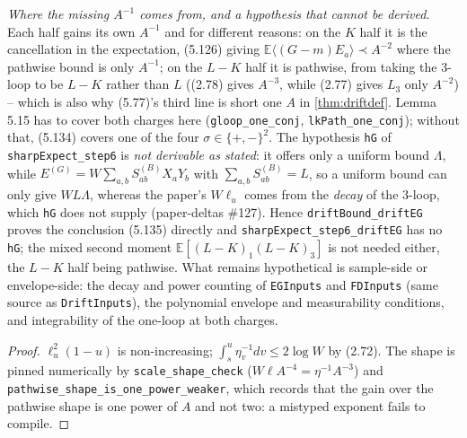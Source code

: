\begin{theorem}
  \emph{Where the missing $A^{-1}$ comes from, and a hypothesis that cannot be derived.}  Each
  half gains its own $A^{-1}$ and for different reasons: on the $K$ half it is the cancellation in
  the expectation, (5.126) giving $\mathbb E\langle(G-m)E_a\rangle\prec A^{-2}$ where the pathwise
  bound is only $A^{-1}$; on the $L-K$ half it is pathwise, from taking the 3-loop to be $L-K$
  rather than $L$ ((2.78) gives $A^{-3}$, while (2.77) gives $L_3$ only $A^{-2}$) -- which is also
  why (5.77)'s third line is short one $A$ in \ref{thm:driftdef}.  Lemma 5.15 has to cover both
  charges here (\texttt{gloop\_one\_conj}, \texttt{lkPath\_one\_conj}); without that, (5.134)
  covers one of the four $\sigma\in\{+,-\}^2$.  The hypothesis \texttt{hG} of
  \texttt{sharpExpect\_step6} is \emph{not derivable as stated}: it offers only a uniform bound
  $\Lambda$, while $E^{(G)}=W\sum_{a,b}S^{(B)}_{ab}X_aY_b$ with $\sum_{a,b}S^{(B)}_{ab}=L$, so a
  uniform bound can only give $W L\Lambda$, whereas the paper's $W\ell_u$ comes from the
  \emph{decay} of the 3-loop, which \texttt{hG} does not supply (paper-deltas \#127).  Hence
  \texttt{driftBound\_driftEG} proves the conclusion (5.135) directly and
  \texttt{sharpExpect\_step6\_driftEG} has no \texttt{hG}; the mixed second moment
  $\mathbb E[(L-K)_1(L-K)_3]$ is not needed either, the $L-K$ half being pathwise.  What remains
  hypothetical is sample-side or envelope-side: the decay and power counting of \texttt{EGInputs}
  and \texttt{FDInputs} (same source as \texttt{DriftInputs}), the polynomial envelope and
  measurability conditions, and integrability of the one-loop at both charges.
\end{theorem}
\begin{proof}\leanok
  $\ell_u^2(1-u)$ is non-increasing; $\int_s^u\eta_v^{-1}dv\le2\log W$ by (2.72).
  The shape is pinned numerically by \texttt{scale\_shape\_check}
  ($W\ell A^{-4}=\eta^{-1}A^{-3}$) and \texttt{pathwise\_shape\_is\_one\_power\_weaker}, which
  records that the gain over the pathwise shape is one power of $A$ and not two: a mistyped
  exponent fails to compile.
\end{proof}

